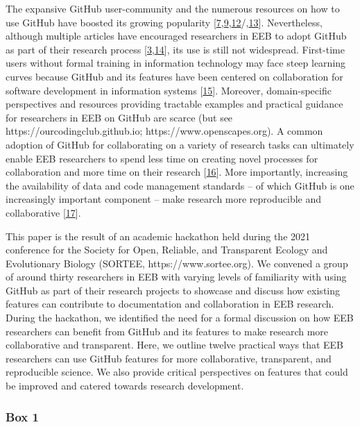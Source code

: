 The expansive GitHub user-community and the numerous resources on how to use GitHub have boosted its growing popularity {[}\protect\hyperlink{ref-RVetqmsg}{7},\protect\hyperlink{ref-kEX5dgzK}{9},\protect\hyperlink{ref-13jOlVcpp}{12}/,\protect\hyperlink{ref-u5aEVE4B}{13}{]}.
Nevertheless, although multiple articles have encouraged researchers in EEB to adopt GitHub as part of their research process {[}\protect\hyperlink{ref-10ghgV3S8}{3},\protect\hyperlink{ref-3DKwn1sY}{14}{]}, its use is still not widespread.
First-time users without formal training in information technology may face steep learning curves because GitHub and its features have been centered on collaboration for software development in information systems {[}\protect\hyperlink{ref-139b0pSGc}{15}{]}.
Moreover, domain-specific perspectives and resources providing tractable examples and practical guidance for researchers in EEB on GitHub are scarce (but see https://ourcodingclub.github.io; https://www.openscapes.org).
A common adoption of GitHub for collaborating on a variety of research tasks can ultimately enable EEB researchers to spend less time on creating novel processes for collaboration and more time on their research {[}\protect\hyperlink{ref-ydrk01SR}{16}{]}.
More importantly, increasing the availability of data and code management standards -- of which GitHub is one increasingly important component -- make research more reproducible and collaborative {[}\protect\hyperlink{ref-13QX8XU3J}{17}{]}.

This paper is the result of an academic hackathon held during the 2021 conference for the Society for Open, Reliable, and Transparent Ecology and Evolutionary Biology (SORTEE, https://www.sortee.org).
We convened a group of around thirty researchers in EEB with varying levels of familiarity with using GitHub as part of their research projects to showcase and discuss how existing features can contribute to documentation and collaboration in EEB research.
During the hackathon, we identified the need for a formal discussion on how EEB researchers can benefit from GitHub and its features to make research more collaborative and transparent.
Here, we outline twelve practical ways that EEB researchers can use GitHub features for more collaborative, transparent, and reproducible science.
We also provide critical perspectives on features that could be improved and catered towards research development.

\hypertarget{definitions}{%
\subsubsection{Box 1}\label{definitions}}


